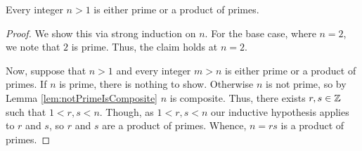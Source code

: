 \guard





\begin{lem}
\label{lem:positiveNotUnitIntegerPrimeOrProductOfPrimes}
  Every integer $n>1$ is either prime or a product of primes.
\end{lem}
\begin{proof}
  We show this via strong induction on $n$.
  For the base case, where $n=2$, we note that $2$ is prime.
  Thus, the claim holds at $n=2$.

  Now, suppose that $n>1$ and every integer $m>n$ is either prime or a product of primes.
  If $n$ is prime, there is nothing to show.
  Otherwise $n$ is not prime, so by Lemma \ref{lem:notPrimeIsComposite} $n$ is composite.
  Thus, there exists $r,s\in\mathbb{Z}$ such that $1<r,s<n$.
  Though, as $1<r,s<n$ our inductive hypothesis applies to $r$ and $s$, so $r$ and $s$ are a product of primes.
  Whence, $n=rs$ is a product of primes.
\end{proof}
